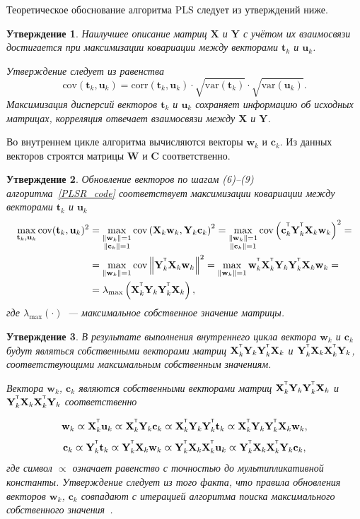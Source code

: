 \documentclass[12pt,twoside]{article}
\newtheorem{statement}{Утверждение}
\newcommand{\bw}{\mathbf{w}}
\newcommand{\bY}{\mathbf{Y}}
\newcommand{\bX}{\mathbf{X}}
\newcommand{\bu}{\mathbf{u}}
\newcommand{\bt}{\mathbf{t}}
\newcommand{\bc}{\mathbf{c}}
\newcommand{\bC}{\mathbf{C}}
\newcommand{\bW}{\mathbf{W}}
\begin{document}
Теоретическое обоснование алгоритма PLS следует из утверждений ниже.
\begin{statement}
Наилучшее описание матриц $\bX$ и $\bY$ с учётом их взаимосвязи достигается при максимизации ковариации между векторами $\bt_k$ и $\bu_k$. 

Утверждение следует из равенства
\[
	\text{cov} (\bt_k, \bu_k) = \text{corr} (\bt_k, \bu_k) \cdot \sqrt{\text{var}(\bt_k)} \cdot \sqrt{\text{var}(\bu_k)}.
\]
Максимизация дисперсий векторов $\bt_k$ и $\bu_k$ сохраняет информацию об исходных матрицах, 
корреляция отвечает взаимосвязи между $\bX$ и $\bY$.
\end{statement}
Во внутреннем цикле алгоритма вычисляются векторы $\bw_k$ и $\bc_k$. Из данных векторов строятся матрицы $\bW$ и $\bC$ соответственно.
\begin{statement}
Обновление векторов по шагам (6)--(9) алгоритма~\ref{PLSR_code} соответствует максимизации ковариации между векторами $\bt_k$ и $\bu_k$
\begin{align*}
\max_{\bt_k, \bu_k}  \text{cov} (\bt_k, \bu_k)^2 &= \max_{\substack{\|\bw_k\|=1 \\ \|\bc_k\| = 1}} \text{cov} \left( \bX_k \bw_k, \bY_k \bc_k \right)^2 = \max_{\substack{\|\bw_k\|=1 \\ \|\bc_k\| = 1}} \text{cov} \left(\bc_k^{\T}  \bY_k^{\T} \bX_k \bw_k \right)^2 = \\
&= \max_{\|\bw_k\| = 1} \text{cov} \left\|\bY_k^{\T} \bX_k \bw_k \right\|^2 = \max_{\|\bw_k\| = 1} \bw_k^{\T} \bX_k^{\T} \bY_k \bY_k^{\T} \bX_k \bw_k = \\
& = \lambda_{\max} \left( \bX_k^{\T} \bY_k \bY_k^{\T} \bX_k \right),
\end{align*}
где $ \lambda_{\max} (\cdot)$~--- максимальное собственное значение матрицы.
\end{statement}

\begin{statement}
В результате выполнения внутреннего цикла вектора $\bw_k$ и $\bc_k$ будут являться собственными векторами матриц $\bX_k^{\T} \bY_k \bY_k^{\T} \bX_k$ и $\bY_k^{\T} \bX_k \bX_k^{\T} \bY_k$, соответствующими максимальным собственным значениям.

Вектора $\bw_k$, $\bc_k$ являются собственными векторами матриц $\bX_k^{\T} \bY_k \bY_k^{\T} \bX_k$ и $\bY_k^{\T} \bX_k \bX_k^{\T} \bY_k$ соответственно

\begin{equation*}
\bw_k \varpropto \bX_k^{\T} \bu_k \varpropto \bX_k^{\T} \bY_k \bc_k \varpropto \bX_k^{\T} \bY_k \bY_k^{\T} \bt_k \varpropto \bX_k^{\T} \bY_k \bY_k^{\T} \bX_k \bw_k,
\end{equation*}
\begin{equation*}
\bc_k \varpropto \bY_k^{\T} \bt_k \varpropto \bY_k^{\T} \bX_k \bw_k \varpropto \bY_k^{\T} \bX_k \bX_k^{\T} \bu_k \varpropto \bY_k^{\T} \bX_k \bX_k^{\T} \bY_k \bc_k,
\end{equation*}
где символ $\varpropto$ означает равенство с точностью до мультипликативной константы. 
Утверждение следует из того факта, что правила обновления векторов $\bw_k$, $\bc_k$ совпадают с итерацией алгоритма поиска максимального собственного значения~\cite{Mises1929}.
\end{statement}
\end{document}
